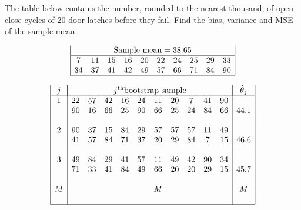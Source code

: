 \begin{labwork}
The table below contains the number, rounded to the nearest thousand, of open-close cycles of 20 door latches before they fail. Find the bias, variance and MSE of the sample mean.

\begin{table}[h]
$$\begin{array}{|cccccccccc|}
\multicolumn{10}{|c|}{\textrm{Sample mean} = 38.65}\\\hline
7	&11&	15&	16&	20&	22&	24&	25&	29&	33\\
34	&37	&41	&42	&49	&57	&66	&71	&84	&90\\\hline
\end{array}$$
\end{table}

\begin{table}[h]
$$\begin{array}{|c|cccccccccc|c|}
\multicolumn{1}{|c|}{j}&\multicolumn{10}{|c|}{j^{\textrm{th}} \textrm{bootstrap sample}} &\multicolumn{1}{|c|}{ \hat{\theta}_j}\\ \hline
1	&22 & 57 & 42&  16 & 24 & 11 & 20&   7 & 41&  90&\\
&90  &16 & 66 & 25 & 90 & 66 & 25&  24 & 84 & 66	&44.1\\
&&&&&&&&&&&\\		
2	&90 & 37 & 15 & 84 & 29 & 57  &57 & 57&  11 & 49&\\
&41&  57 & 84  &71 & 37 & 20 & 29&  84&   7 & 15	&46.6\\
		&&&&&&&&&&&\\	
3	&49 & 84&  29 & 41 & 57 & 11 & 49 & 42  &90 & 34&\\
&71&  33&  41 & 84 & 49 & 66 & 20 & 20 & 29 & 15&	45.7\\
&&&&&&&&&&&\\	
M&&&&&&M&&&&&M\\	
&&&&&&&&&&&\\\hline
\end{array}$$
\end{table}


\end{labwork}

